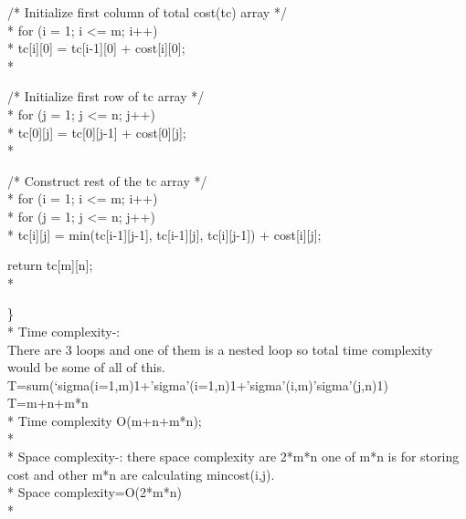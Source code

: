 \documentclass[12pt]{book}
\begin{document}
\phantom{x} \hspace{3ex}     /* Initialize first column of total cost(tc) array */\\*
\phantom{x} \hspace{3ex}     for (i = 1; i <= m; i++)\\*
\phantom{x} \hspace{3ex} \phantom{x} \hspace{3ex}       tc[i][0] = tc[i-1][0] + cost[i][0];\\*
  
\phantom{x} \hspace{3ex}     /* Initialize first row of tc array */\\*
\phantom{x} \hspace{3ex}     for (j = 1; j <= n; j++)\\*
\phantom{x} \hspace{3ex} \phantom{x} \hspace{3ex}       tc[0][j] = tc[0][j-1] + cost[0][j];\\*
  
\phantom{x} \hspace{3ex}     /* Construct rest of the tc array */\\*
\phantom{x} \hspace{3ex}     for (i = 1; i <= m; i++)\\*
\phantom{x} \hspace{3ex}  \phantom{x} \hspace{3ex}      for (j = 1; j <= n; j++)\\*
\phantom{x} \hspace{3ex}  \phantom{x} \hspace{3ex} \phantom{x} \hspace{3ex}         tc[i][j] = min(tc[i-1][j-1], 
                           tc[i-1][j], 
                           tc[i][j-1]) + cost[i][j];
  
\phantom{x} \hspace{3ex}     return tc[m][n]; \\*


\} \\*
\newline
\newline
Time complexity-:\\
There are 3 loops and one of them is a nested loop so total time complexity would be some of all of this.
T=sum(‘sigma(i=1,m)1+’sigma’(i=1,n)1+’sigma’(i,m)’sigma’(j,n)1) \\
T=m+n+m*n \\*
Time complexity O(m+n+m*n); \\*\\*
Space complexity-: there space complexity are 2*m*n one of m*n is for storing cost and other m*n are calculating mincost(i,j).\\*
Space complexity=O(2*m*n)\\*
\end{document}
